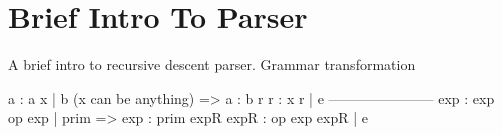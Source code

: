 \section{Brief Intro To Parser}

A brief intro to recursive descent parser.
Grammar transformation
  \begin{bluetext}
    a : a x | b (x can be anything)
    =>
    a : b r
    r : x r | e
    -----------------------
    exp : exp op exp | prim
    =>
    exp : prim expR
    expR : op exp expR | e 
  \end{bluetext}
